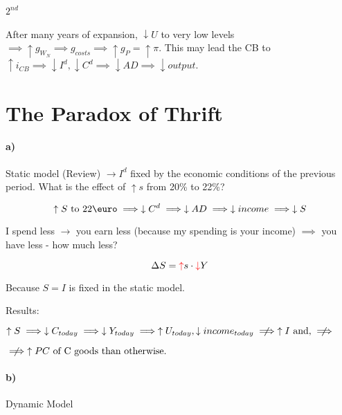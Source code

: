 \documentclass{report}
\begin{document}
\paragraph{$2^{nd}$} After many years of expansion, $\downarrow U$ to very low levels $\implies \uparrow g_{W_N} \implies g_{costs} \implies \uparrow g_P=\uparrow \pi$. This may lead the CB to $\uparrow i_{CB} \implies \downarrow I^d, \downarrow C^d \implies \downarrow AD \implies \downarrow output$.

\section{The Paradox of Thrift}

\paragraph{a)} Static model (Review) $\rightarrow I^d$ fixed by the economic conditions of the previous period. What is the effect of $\uparrow s$ from 20\% to 22\%? 


$$\uparrow S \text{ to 22\euro} \implies \downarrow C^d \implies \downarrow AD \implies \downarrow income \implies \downarrow S$$

I spend less $\rightarrow$ you earn less (because my spending is your income) $\implies$ you have less - how much less? 

$$\Delta S= {\color{red}{\uparrow}}s\cdot {\color{red}{\downarrow}} Y$$

Because $S=I$ is fixed in the static model. 

Results: 

$\uparrow S \implies \downarrow C_{today} \implies \downarrow Y_{today} \implies \uparrow U_{today}, \downarrow income_{today} \centernot\implies \uparrow I \text{ and,} \centernot\implies $

$\centernot\implies \uparrow PC\text{ of C goods than otherwise.}$

\paragraph{b)} Dynamic Model 
\end{document}
